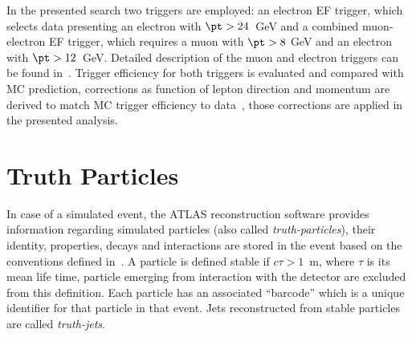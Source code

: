 In the presented search two triggers are employed: an electron EF trigger, which selects data presenting 
an electron with $\pt >24 $~GeV and a combined muon-electron EF trigger, which requires a muon with $\pt > 8$ GeV and 
an electron with $\pt > 12$~GeV. Detailed description of the muon and electron triggers can be found in~\cite{triggermu,triggere}.
Trigger efficiency for both triggers is evaluated and compared with MC prediction, corrections as function of lepton
direction and momentum are derived to match MC trigger efficiency to data~\cite{triggermu,triggere}, 
those corrections are applied in the presented analysis.

\section{Truth Particles}
In case of a simulated event, the ATLAS reconstruction software provides information regarding
simulated particles (also called \emph{truth-particles}), their identity, properties, decays and 
interactions are stored in the event  based on the conventions defined in~\cite{hepmc}.
A particle is defined stable if $c \tau > 1$~m, where $\tau$ is its mean life time, particle emerging from 
interaction with the detector are excluded from this definition. 
Each particle has an associated ``barcode'' which is a unique identifier for that particle
in that event. Jets reconstructed from stable particles are called \emph{truth-jets}.

